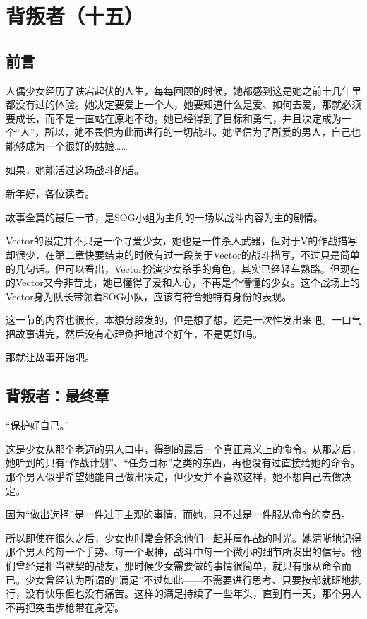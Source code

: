 \chapter{背叛者（十五）}

\section*{前言}


人偶少女经历了跌宕起伏的人生，每每回顾的时候，她都感到这是她之前十几年里都没有过的体验。她决定要爱上一个人，她要知道什么是爱、如何去爱，那就必须要成长，而不是一直站在原地不动。她已经得到了目标和勇气，并且决定成为一个“人”，所以，她不畏惧为此而进行的一切战斗。她坚信为了所爱的男人，自己也能够成为一个很好的姑娘……

如果，她能活过这场战斗的话。

\lineseparator

新年好，各位读者。

故事全篇的最后一节，是SOG小组为主角的一场以战斗内容为主的剧情。

Vector的设定并不只是一个寻爱少女，她也是一件杀人武器，但对于V的作战描写却很少，在第二章快要结束的时候有过一段关于Vector的战斗描写，不过只是简单的几句话。但可以看出，Vector扮演少女杀手的角色，其实已经轻车熟路。但现在的Vector又今非昔比，她已懂得了爱和人心，不再是个懵懂的少女。这个战场上的Vector身为队长带领着SOG小队，应该有符合她特有身份的表现。

这一节的内容也很长，本想分段发的，但是想了想，还是一次性发出来吧。一口气把故事讲完，然后没有心理负担地过个好年，不是更好吗。

那就让故事开始吧。

\section*{背叛者：最终章}


“保护好自己。”

这是少女从那个老迈的男人口中，得到的最后一个真正意义上的命令。从那之后，她听到的只有“作战计划”、“任务目标”之类的东西，再也没有过直接给她的命令。那个男人似乎希望她能自己做出决定，但少女并不喜欢这样，她不想自己去做决定。

因为“做出选择”是一件过于主观的事情，而她，只不过是一件服从命令的商品。

所以即使在很久之后，少女也时常会怀念他们一起并肩作战的时光。她清晰地记得那个男人的每一个手势、每一个眼神，战斗中每一个微小的细节所发出的信号。他们曾经是相当默契的战友，那时候少女需要做的事情很简单，就只有服从命令而已。少女曾经认为所谓的“满足”不过如此——不需要进行思考、只要按部就班地执行，没有快乐但也没有痛苦。这样的满足持续了一些年头，直到有一天，那个男人不再把突击步枪带在身旁。

